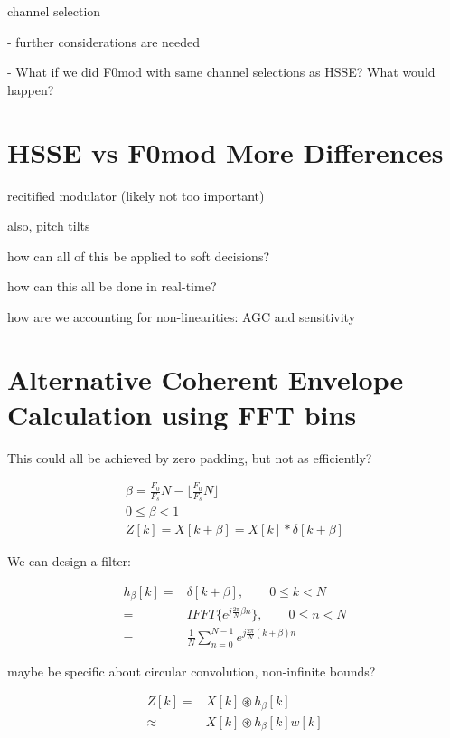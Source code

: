 \documentclass [11pt, proquest] {uwthesis}[2015/03/03]
\begin{document}
channel selection

 - further considerations are needed

 - What if we did F0mod with same channel selections as HSSE?  What would happen?

\section{HSSE vs F0mod More Differences}

recitified modulator (likely not too important)

also, pitch tilts

how can all of this be applied to soft decisions?

how can this all be done in real-time?

how are we accounting for non-linearities: AGC and sensitivity




\section{Alternative Coherent Envelope Calculation using FFT bins}

This could all be achieved by zero padding, but not as efficiently?

\begin{align}
\beta = \frac{F_0}{F_s}N - \Big\lfloor \frac{F_0}{F_s}N \Big\rfloor \\
0 \leq \beta < 1 \nonumber \\
Z[k] = X[k + \beta] = X[k] * \delta[k + \beta] \nonumber
\end{align}

We can design a filter:

\begin{align}
h_{\beta}[k] =& \delta[k + \beta], \qquad 0 \leq k < N  \nonumber \\
=& IFFT\{e^{j\frac{2\pi}{N} \beta n} \}, \qquad 0 \leq n < N \nonumber \\
=& \frac{1}{N} \sum_{n=0}^{N-1} e^{j\frac{2\pi}{N}(k + \beta)n}
\end{align}

maybe be specific about circular convolution, non-infinite bounds?

\begin{align}
Z[k] =& X[k] \circledast h_\beta[k] \nonumber \\
\approx& X[k] \circledast h_\beta[k]w[k]
\end{align}
\end{document}
